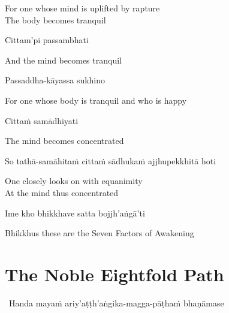 \begin{english}
  For one whose mind is uplifted by rapture\\
  The body becomes tranquil
\end{english}

Cittam'pi passambhati

\begin{english}
  And the mind becomes tranquil
\end{english}

Passaddha-kāyassa sukhino

\begin{english}
  For one whose body is tranquil and who is happy
\end{english}

\ifbfiveversion\clearpage\fi

Cittaṁ samādhiyati

\begin{english}
  The mind becomes concentrated
\end{english}

So tathā-samāhitaṁ cittaṁ sādhukaṁ ajjhupekkhitā hoti

\begin{english}
  One closely looks on with equanimity\\
  At the mind thus concentrated
\end{english}

\suttaRef{[SN 46.3]}

Ime kho bhikkhave satta bojjh'aṅgā'ti

\begin{english}
  Bhikkhus these are the Seven Factors of Awakening
\end{english}

\suttaRef{[SN 46.22]}

\ifdigitalversion{}\fi



\section{The Noble Eightfold Path}
\label{noble-eightfold-path}

\begin{leader}
  \anglebracketleft\ \hspace{-0.5mm}Handa mayaṁ ariy'aṭṭh'aṅgika-magga-pāṭhaṁ bhaṇāmase \hspace{-0.5mm}\anglebracketright\
\end{leader}

